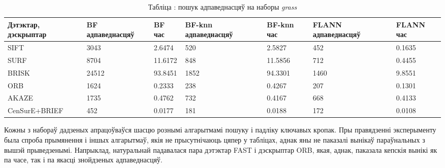 \begin{table}[h]
  \centering
  \begin{footnotesize}
  \begin{tabular}{ | p{20mm} | p{22mm} | p{15mm} | p{22mm} | p{15mm} | p{22mm} | p{15mm} | }
    \hline
    Дэтэктар, дэскрыптар & BF адпаведнасцяў & BF час & BF-knn адпаведнасцяў & BF-knn час & FLANN адпаведнасцяў & FLANN час \\ \hline
    SIFT & 3043 & 2.6474 & 520 & 2.5827 & 452 & 0.1635 \\ \hline
    SURF & 8704 & 11.6172 & 848 & 11.5856 & 712 & 0.4455 \\ \hline
    BRISK & 24512 & 93.8451 & 1852 & 94.3301 & 1460 & 9.8551 \\ \hline
    ORB & 1624 & 0.2333 & 238 & 0.4267 & 207 & 0.1301 \\ \hline
    AKAZE & 1735 & 0.4762 & 732 & 0.4167 & 668 & 0.4133 \\ \hline
    CenSurE+\newline BRIEF & 452 & 0.0177 & 181 & 0.0188 & 172 & 0.0108 \\ \hline
  \end{tabular}
  \end{footnotesize}
\captionsetup{labelformat=empty,justification=centering}
\caption{Табліца : пошук адпаведнасцяў на наборы \textit{grass}}
\label{table:grass-matching}
\end{table}

Кожны з набораў дадзеных апрацоўваўся шасцю рознымі алгарытмамі пошуку і падліку ключавых кропак.
Пры правядзенні эксперыменту была спроба прымянення і іншых алгарытмаў, якія не прысутнічаюць цяпер у табліцах,
аднак яны не паказалі вынікаў параўнальных з вышэй прыведзенымі. Напрыклад, натуральнай падавалася пара дэтэктар FAST і
дэскрыптар ORB, якая, аднак, паказала кепскія вынікі як па часе, так і па якасці знойдзеных адпаведнасцяў.


